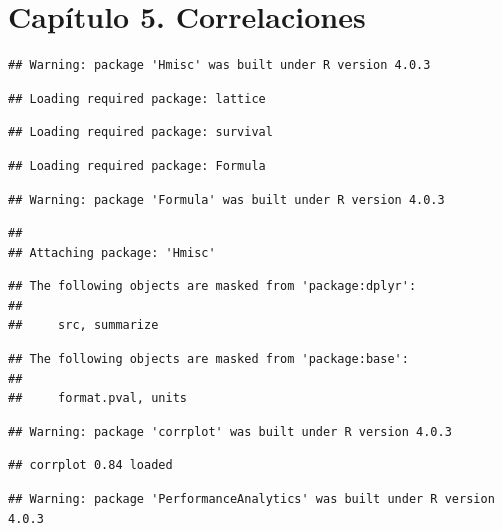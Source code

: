 \documentclass[
  11pt,
]{book}
\begin{document}
\hypertarget{capuxedtulo-5.-correlaciones}{%
\chapter{Capítulo 5. Correlaciones}\label{capuxedtulo-5.-correlaciones}}

\begin{verbatim}
## Warning: package 'Hmisc' was built under R version 4.0.3
\end{verbatim}

\begin{verbatim}
## Loading required package: lattice
\end{verbatim}

\begin{verbatim}
## Loading required package: survival
\end{verbatim}

\begin{verbatim}
## Loading required package: Formula
\end{verbatim}

\begin{verbatim}
## Warning: package 'Formula' was built under R version 4.0.3
\end{verbatim}

\begin{verbatim}
## 
## Attaching package: 'Hmisc'
\end{verbatim}

\begin{verbatim}
## The following objects are masked from 'package:dplyr':
## 
##     src, summarize
\end{verbatim}

\begin{verbatim}
## The following objects are masked from 'package:base':
## 
##     format.pval, units
\end{verbatim}

\begin{verbatim}
## Warning: package 'corrplot' was built under R version 4.0.3
\end{verbatim}

\begin{verbatim}
## corrplot 0.84 loaded
\end{verbatim}

\begin{verbatim}
## Warning: package 'PerformanceAnalytics' was built under R version 4.0.3
\end{verbatim}
\end{document}
